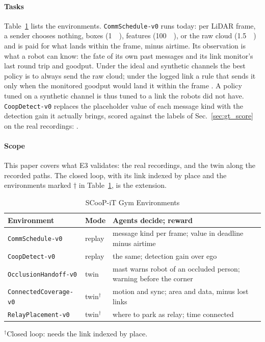 \paragraph{Tasks} Table~\ref{tab:gym} lists the environments.
\texttt{CommSchedule-v0} runs today: per LiDAR frame, a sender chooses
nothing, boxes (\SI{1}{\kilo\byte}), features (\SI{100}{\kilo\byte}), or
the raw cloud (\SI{1.5}{\mega\byte}) and is paid for what lands within
the frame, minus airtime. Its observation is what a robot can know:
the fate of its own past messages and its link monitor's last round trip
and goodput. Under the ideal and synthetic channels the best policy is
to always send the raw cloud; under the logged link a rule that sends it
only when the monitored goodput would land it within the frame
.
A policy tuned on a synthetic channel is thus tuned to a link the robots
did not have. \texttt{CoopDetect-v0} replaces the placeholder value of
each message kind with the detection gain it actually brings, scored
against the labels of Sec.~\ref{sec:gt_score} on the real recordings:
.

\paragraph{Scope} This paper covers what E3 validates: the real
recordings, and the twin along the recorded paths. The closed loop, with
its link indexed by place and the environments marked $\dagger$ in
Table~\ref{tab:gym}, is the extension.

\begin{table}[!t]
\centering
\caption{SCooP-iT Gym Environments}
\label{tab:gym}
\footnotesize
\setlength{\tabcolsep}{3pt}
\begin{tabular}{@{}l l p{3.6cm}@{}}
\toprule
Environment & Mode & Agents decide; reward \\
\midrule
\texttt{CommSchedule-v0} & replay & message kind per frame; value in deadline minus airtime \\
\texttt{CoopDetect-v0} & replay & the same; detection gain over ego \\
\texttt{OcclusionHandoff-v0} & twin & mast warns robot of an occluded person; warning before the corner \\
\texttt{ConnectedCoverage-v0} & twin$^\dagger$ & motion and sync; area and data, minus lost links \\
\texttt{RelayPlacement-v0} & twin$^\dagger$ & where to park as relay; time connected \\
\bottomrule
\end{tabular}

\vspace{2pt}
{\scriptsize $^\dagger$Closed loop: needs the link indexed by place.}
\end{table}
